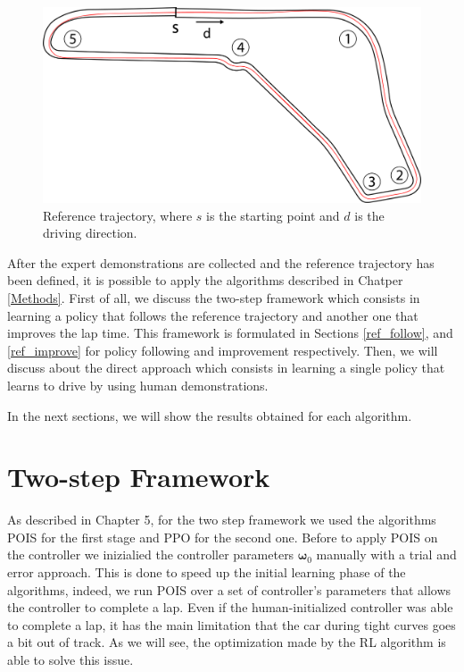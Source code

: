 \begin{figure}[H]
 \centering
  \captionsetup{width=12cm}
  \includegraphics[width=12cm]{./img/ref_traj}
  \caption{Reference trajectory, where $s$ is the starting point and $d$ is the driving direction.}
   \label{fig:ref_traj}
\end{figure}

After the expert demonstrations are collected and the reference trajectory has been defined, it is possible to apply the algorithms described in Chatper \ref{Methods}. First of all, we discuss the two-step framework which consists in learning a policy
that follows the reference trajectory and another one that improves the lap time. This framework is formulated in Sections \ref{ref_follow}, and \ref{ref_improve} for policy following and improvement respectively. Then, we will discuss about the direct approach which consists in learning a single policy that learns to drive by using human demonstrations.

In the next sections, we will show the results obtained for each algorithm.

\section{Two-step Framework}
As described in Chapter 5, for the two step framework we used the algorithms POIS for the first stage and PPO for the second one. Before to apply POIS on the controller we inizialied the controller parameters $\boldsymbol {\omega}_0$ manually with a trial and error approach. This is done to speed up the initial learning phase of the algorithms, indeed, we run POIS over a set of controller's parameters that allows the controller to complete a lap.
Even if the human-initialized controller was able to complete a lap, it has the main limitation that the car during tight curves goes a bit out of track. As we will see, the optimization made by the RL algorithm is able to solve
this issue.

